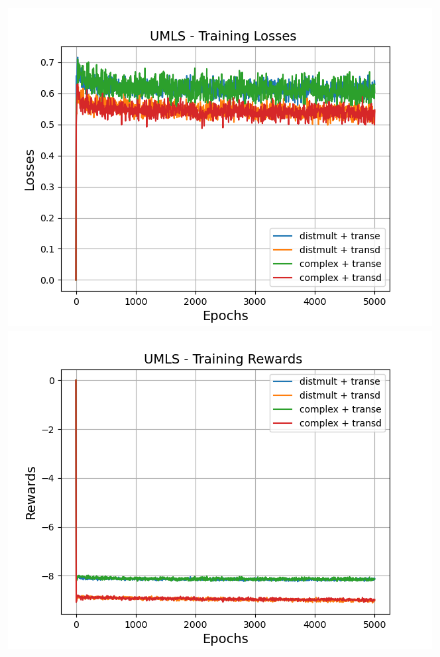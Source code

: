 \begin{figure}
    \centering
    \begin{minipage}{.5\textwidth}
      \centering
      \includegraphics[width=0.9\linewidth]{figures/results/gan_train/pretrained/uncertainty/max_distribution/entropy/umls/gan_train_uncertainty_umls_losses.png}
    \end{minipage}%
    \begin{minipage}{.5\textwidth}
      \centering
      \includegraphics[width=0.9\linewidth]{figures/results/gan_train/pretrained/uncertainty/max_distribution/entropy/umls/gan_train_uncertainty_umls_rewards.png}
    \end{minipage}
    \begin{minipage}{.5\textwidth}
      \centering

\end{minipage}
\end{figure}
